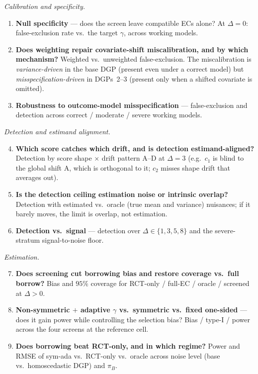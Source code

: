 \documentclass[11pt]{article}
\begin{document}
\emph{Calibration and specificity.}
\begin{enumerate}
    \item \textbf{Null specificity} --- does the screen leave compatible ECs alone? At $\Delta{=}0$: false-exclusion rate vs.\ the target $\gamma$, across working models.
    \item \textbf{Does weighting repair covariate-shift miscalibration, and by which mechanism?} Weighted vs.\ unweighted false-exclusion. The miscalibration is \emph{variance-driven} in the base DGP (present even under a correct model) but \emph{misspecification-driven} in DGPs~2--3 (present only when a shifted covariate is omitted).
    \item \textbf{Robustness to outcome-model misspecification} --- false-exclusion and detection across correct / moderate / severe working models.
\end{enumerate}

\emph{Detection and estimand alignment.}
\begin{enumerate}\setcounter{enumi}{3}
    \item \textbf{Which score catches which drift, and is detection estimand-aligned?} Detection by score shape $\times$ drift pattern A--D at $\Delta{=}3$ (e.g.\ $c_1$ is blind to the global shift A, which is orthogonal to it; $c_2$ misses shape drift that averages out).
    \item \textbf{Is the detection ceiling estimation noise or intrinsic overlap?} Detection with estimated vs.\ oracle (true mean and variance) nuisances; if it barely moves, the limit is overlap, not estimation.
    \item \textbf{Detection vs.\ signal} --- detection over $\Delta\in\{1,3,5,8\}$ and the severe-stratum signal-to-noise floor.
\end{enumerate}

\emph{Estimation.}
\begin{enumerate}\setcounter{enumi}{6}
    \item \textbf{Does screening cut borrowing bias and restore coverage vs.\ full borrow?} Bias and $95\%$ coverage for RCT-only / full-EC / oracle / screened at $\Delta>0$.
    \item \textbf{Non-symmetric $+$ adaptive $\gamma$ vs.\ symmetric vs.\ fixed one-sided} --- does it gain power while controlling the selection bias? Bias / type-I / power across the four screens at the reference cell.
    \item \textbf{Does borrowing beat RCT-only, and in which regime?} Power and RMSE of sym-ada vs.\ RCT-only vs.\ oracle across noise level (base vs.\ homoscedastic DGP) and $\pi_B$.
\end{enumerate}
\end{document}
